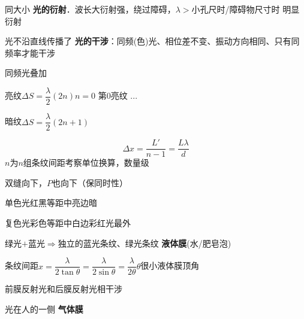\quad {} 同大小
\textbf{光的衍射}．波长大衍射强，绕过障碍，$\lambda>$小孔尺时/障碍物尺寸时 明显衍射

光不沿直线传播了
\textbf{光的干涉}：同频(色)光、相位差不变、振动方向相同、只有同频率才能干涉

\quad 同频光叠加


亮纹\quad $\Delta S=\dfrac{\lambda}{2}(2n)$\quad $n=0$ 第0亮纹 ...

暗纹\quad $\Delta S=\dfrac{\lambda}{2}(2n+1)$\quad {}

\[\Delta x=\frac{L'}{n-1}=\frac{L\lambda}{d}\] %
$n$为$n$组条纹间距\quad 考察单位换算，数量级 %

双缝向下，$P$也向下（保同时性）

单色光\quad 红黑等距\quad 中亮边暗

复色光\quad 彩色等距\quad 中白边彩\quad 红光最外

绿光$+$蓝光$\Rightarrow$独立的蓝光条纹、绿光条纹
\textbf{液体膜}(水/肥皂泡)

条纹间距\quad $x=\dfrac{\lambda}{2\tan\theta}=\dfrac{\lambda}{2\sin\theta}=\dfrac{\lambda}{2\theta}$\quad $\theta$很小\quad 液体膜顶角


前膜反射光和后膜反射光相干涉

光在人的一侧
\textbf{气体膜}



